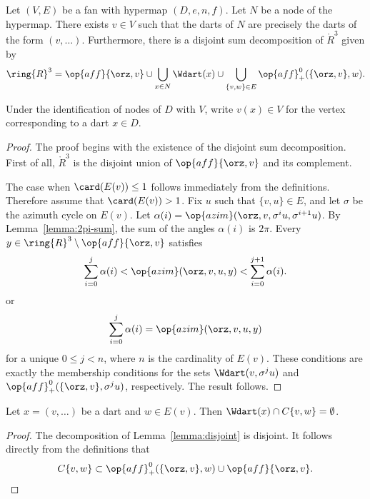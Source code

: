 

\begin{lemma}
Let $(V,E)$ be a fan with hypermap $(D,e,n,f)$.  Let $N$ be a node of the hypermap.  There exists $v\in V$
such that the darts of $N$ are precisely
the darts of the form $(v,\ldots)$.  Furthermore, there is a 
disjoint sum decomposition of $\ring{R}^3$ given by
  $$
  \ring{R}^3 = 
  \op{aff}\{\orz,v\} \cup
  \bigcup_{x\in N} \Wdart(x)  \cup 
  \bigcup_{\{v,w\}\in E} \op{aff}_+^0(\{\orz,v\},w).
  $$
\end{lemma}
%
%
%

\begin{definition}
Under the identification of nodes of $D$ with $V$,
write $v(x)\in V$ for the vertex corresponding to a dart $x\in D$. 
\end{definition}

\begin{proof}
The proof begins with the existence of the disjoint sum decomposition.
First of all, $\ring{R}^3$ is the disjoint union of $\op{aff}\{\orz,v\}$
and its complement.

The case when $\card(E(v))\le 1$ follows immediately from the definitions.  
Therefore assume  that $\card(E(v)) >1$.
Fix $u$ such that $\{v,u\}\in E$, and let $\sigma$ be the azimuth
cycle on $E(v)$.  Let $\alpha(i)=\op{azim}(\orz,v,\sigma^i u,\sigma^{i+1}u)$.   By Lemma~\ref{lemma:2pi-sum}, the sum of the angles $\alpha(i)$ is $2\pi$.  Every $y\in\ring{R}^3\setminus\op{aff}\{\orz,v\}$ satisfies
$$
\sum_{i=0}^j \alpha(i) <
\op{azim}(\orz,v,u,y) < \sum_{i=0}^{j+1} \alpha(i).
$$
or 
$$
\sum_{i=0}^j \alpha(i) = \op{azim}(\orz,v,u,y)
$$
for a unique $0 \le j < n$, where $n$ is the cardinality of $E(v)$. 
These conditions are exactly the membership conditions for the sets
$
\Wdart(v,\sigma^j u)
$
and $\op{aff}_+^0(\{\orz,v\},\sigma^j u)$, respectively.
The result follows.
\end{proof}

\begin{corollary}
Let $x = (v,\ldots)$ be a dart and $w\in E(v)$.
Then $\Wdart(x)\cap C\{v,w\}=\emptyset$.
\end{corollary}

\begin{proof} The decomposition of Lemma~\ref{lemma:disjoint} is
disjoint.  It follows directly from the definitions that
   $$C\{v,w\}\subset \op{aff}_+^0(\{\orz,v\},w) \cup 
    \op{aff}\{\orz,v\}.$$
\end{proof}

